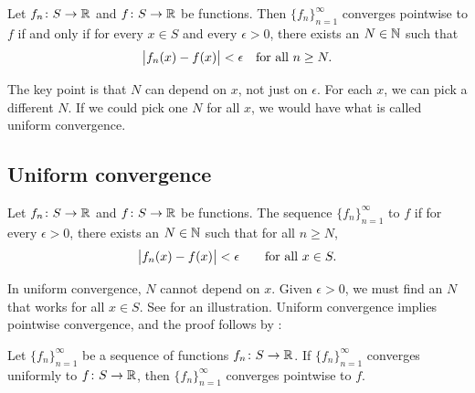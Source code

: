 \begin{prop} \label{ptwsconv:prop}
Let $f_n \colon S \to {\mathbb{R}}$ and $f \colon S \to {\mathbb{R}}$ be functions.
Then $\{ f_n \}_{n=1}^\infty$ converges pointwise to $f$ if and only if
for every $x \in S$ and every $\epsilon > 0$, there exists
an $N \in {\mathbb{N}}$ such that
\begin{equation*}
\bigl\lvert {f_n(x)-f(x)} \bigr\rvert < \epsilon \quad \text{for all } n \geq N .
\end{equation*}
\end{prop}

The key point is that $N$ can depend on $x$, not just on
$\epsilon$.  For each $x$, we can pick a different $N$.
If we could pick one $N$ for all $x$, we would have what is called
uniform convergence.

\subsection{Uniform convergence}

\begin{defn}
Let $f_n \colon S \to {\mathbb{R}}$
and $f \colon S \to {\mathbb{R}}$
be functions.  The sequence $\{ f_n \}_{n=1}^\infty$
\emph{} to $f$ if for
every $\epsilon > 0$, there exists an $N \in {\mathbb{N}}$ such that 
for all $n \geq N$,
\begin{equation*}
\bigl\lvert {f_n(x) - f(x)} \bigr\rvert < \epsilon \qquad \text{for all } x \in S.
\end{equation*}
\end{defn}
\begin{myfigureht}
\caption{In uniform convergence,
for $n \geq N$,
the functions $f_n$ are within a strip of $\pm\epsilon$ from $f$.%
\label{fig:uniformconv}}
\end{myfigureht}

In uniform convergence, $N$ cannot depend on $x$.  Given $\epsilon > 0$,
we must find an $N$ that works for all $x \in S$.  See
 for an illustration.
Uniform convergence
implies pointwise convergence, and the proof follows by
:

\begin{prop}
Let $\{ f_n \}_{n=1}^\infty$ be a sequence of functions $f_n \colon S \to {\mathbb{R}}$.
If $\{ f_n \}_{n=1}^\infty$ converges
uniformly to $f \colon S \to {\mathbb{R}}$, then $\{ f_n \}_{n=1}^\infty$ converges pointwise to $f$.
\end{prop}

